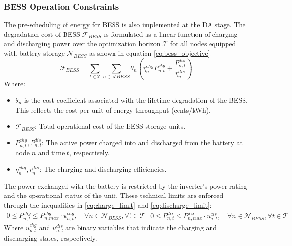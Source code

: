 \documentclass[preprint,12pt]{elsarticle}
\begin{document}
\subsubsection{BESS Operation Constraints}
The pre-scheduling of energy for BESS is also implemented at the DA stage. 
The degradation cost of BESS $\mathcal{F}_{BESS}$ is formulated as a linear function of charging and discharging power over the optimization horizon $\mathcal{T}$ for all nodes equipped with battery storage $\mathcal{N}_{BESS}$ as shown in equation \eqref{eq:bess_objective}, 
\begin{equation}
\mathcal{F}_{BESS} = \sum \limits_{t \in \mathcal{T}} \sum_{n \in \mathcal{N}{BESS}} \theta_{n} \left( \eta_{n}^{chg} P_{n,t}^{chg} + \frac{P_{n,t}^{dis}}{\eta_{n}^{dis}} \right)
\label{eq:bess_objective}
\end{equation}
Where:
\begin{itemize}
    \item $\theta_n$ is the cost coefficient associated with the lifetime degradation of the BESS. This reflects the cost per unit of energy throughput (cents/kWh).
    \item $\mathcal{F}_{BESS}$: Total operational cost of the BESS storage units.
    \item $P_{n,t}^{chg}, P_{n,t}^{dis}$: The active power charged into and discharged from the battery at node $n$ and time $t$, respectively.
    \item $\eta_{n}^{chg}, \eta_{n}^{dis}$: The charging and discharging efficiencies.
\end{itemize}

The power exchanged with the battery is restricted by the inverter's power rating and the operational status of the unit. These technical limits are enforced through the inequalities in \eqref{eq:charge_limit} and \eqref{eq:discharge_limit}:
\begin{subequations}
    \begin{align}
    0 \le P_{n,t}^{chg} \le P_{n,max}^{chg} \cdot u_{n,t}^{chg}, \quad \forall n \in \mathcal{N}_{BESS}, \forall t \in \mathcal{T}
    \label{eq:charge_limit}
    \end{align}
    \begin{align}
    0 \le P_{n,t}^{dis} \le P_{n,max}^{dis} \cdot u_{n,t}^{dis}, \quad \forall n \in \mathcal{N}_{BESS}, \forall t \in \mathcal{T}
    \label{eq:discharge_limit}
    \end{align}
    \label{eq_bess_limits}
\end{subequations}
Where $u_{n,t}^{chg}$ and $u_{n,t}^{dis}$ are binary variables that indicate the charging and discharging states, respectively.
\end{document}
